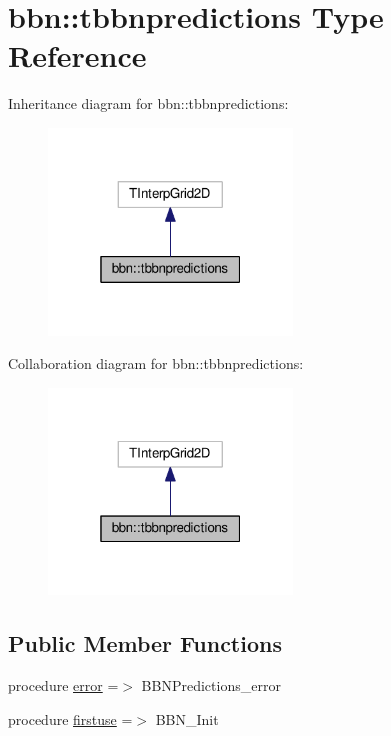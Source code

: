 \hypertarget{structbbn_1_1tbbnpredictions}{}\section{bbn\+:\+:tbbnpredictions Type Reference}
\label{structbbn_1_1tbbnpredictions}


Inheritance diagram for bbn\+:\+:tbbnpredictions\+:
\nopagebreak
\begin{figure}[H]
\begin{center}
\leavevmode
\includegraphics[width=184pt]{structbbn_1_1tbbnpredictions__inherit__graph}
\end{center}
\end{figure}


Collaboration diagram for bbn\+:\+:tbbnpredictions\+:
\nopagebreak
\begin{figure}[H]
\begin{center}
\leavevmode
\includegraphics[width=184pt]{structbbn_1_1tbbnpredictions__coll__graph}
\end{center}
\end{figure}
\subsection*{Public Member Functions}
\begin{DoxyCompactItemize}
\item 
procedure \mbox{\hyperlink{structbbn_1_1tbbnpredictions_a6f001a3c82e2abe3d9004fc767b1a9cd}{error}} =$>$ B\+B\+N\+Predictions\+\_\+error
\item 
procedure \mbox{\hyperlink{structbbn_1_1tbbnpredictions_a6c746e607e29abb7cbb5f79665bd8b12}{firstuse}} =$>$ B\+B\+N\+\_\+\+Init
\end{DoxyCompactItemize}
